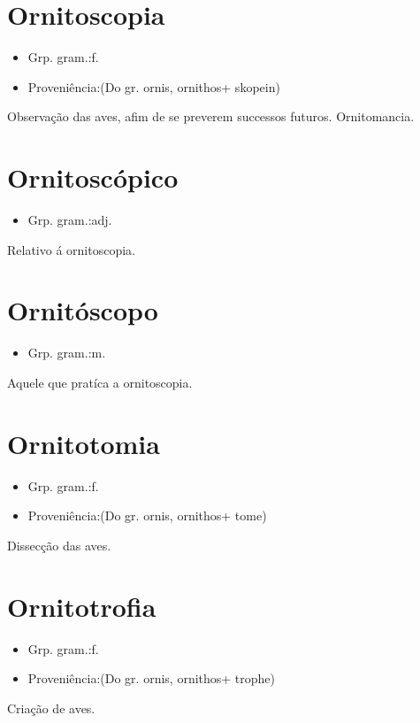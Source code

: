 \section{Ornitoscopia}
\begin{itemize}
\item {Grp. gram.:f.}
\end{itemize}
\begin{itemize}
\item {Proveniência:(Do gr. \textunderscore ornis\textunderscore , \textunderscore ornithos\textunderscore  + \textunderscore skopein\textunderscore )}
\end{itemize}
Observação das aves, afim de se preverem successos futuros.
Ornitomancia.
\section{Ornitoscópico}
\begin{itemize}
\item {Grp. gram.:adj.}
\end{itemize}
Relativo á ornitoscopia.
\section{Ornitóscopo}
\begin{itemize}
\item {Grp. gram.:m.}
\end{itemize}
Aquele que pratíca a ornitoscopia.
\section{Ornitotomia}
\begin{itemize}
\item {Grp. gram.:f.}
\end{itemize}
\begin{itemize}
\item {Proveniência:(Do gr. \textunderscore ornis\textunderscore , \textunderscore ornithos\textunderscore  + \textunderscore tome\textunderscore )}
\end{itemize}
Dissecção das aves.
\section{Ornitotrofia}
\begin{itemize}
\item {Grp. gram.:f.}
\end{itemize}
\begin{itemize}
\item {Proveniência:(Do gr. \textunderscore ornis\textunderscore , \textunderscore ornithos\textunderscore  + \textunderscore trophe\textunderscore )}
\end{itemize}
Criação de aves.
